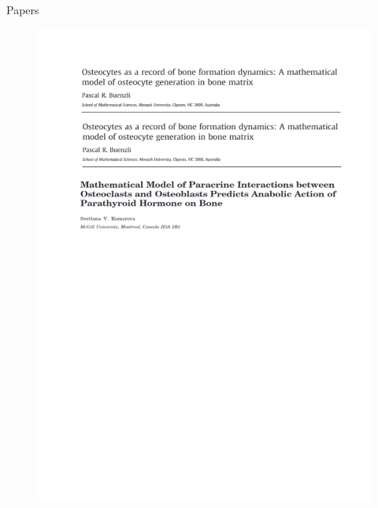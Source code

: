 \documentclass{beamer}
\begin{document}
\begin{frame}{Papers}
	\begin{figure}[h]
		\centering
			\includegraphics[scale=0.5]{../Figures/fig_papers_combined1-3.png}
	\end{figure}
\end{frame}
\end{document}
